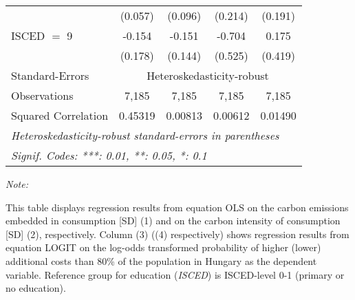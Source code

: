 \begin{table}[htbp!]
\begin{adjustbox}{width = 1\textwidth, max height = 0.95\textheight, center}
\begin{threeparttable}[b]
\begin{tabular}{lcccc}
                                 & (0.057)            & (0.096)            & (0.214)        & (0.191)\\   
            ISCED $=$ 9          & -0.154             & -0.151             & -0.704         & 0.175\\   
                                 & (0.178)            & (0.144)            & (0.525)        & (0.419)\\   
            \midrule 
            Standard-Errors & \multicolumn{4}{c}{Heteroskedasticity-robust} \\ 
            Observations         & 7,185              & 7,185              & 7,185          & 7,185\\  
            Squared Correlation  & 0.45319            & 0.00813            & 0.00612        & 0.01490\\  
            \midrule \midrule
            \multicolumn{5}{l}{\emph{Heteroskedasticity-robust standard-errors in parentheses}}\\
            \multicolumn{5}{l}{\emph{Signif. Codes: ***: 0.01, **: 0.05, *: 0.1}}\\
         \end{tabular}
         
         \begin{tablenotes}\item \medskip \textit{Note:}
            \item This table displays regression results from equation OLS on the carbon emissions embedded in consumption [SD] (1) and on the carbon intensity of consumption [SD] (2), respectively. 
                                      Column (3) ((4) respectively) shows regression results from equation LOGIT on the log-odds transformed probability of higher (lower) additional costs than 80\% of the population in Hungary as the dependent variable. Reference group for education (\textit{ISCED}) is ISCED-level 0-1 (primary or no education).
         \end{tablenotes}
      \end{threeparttable}
   \end{adjustbox}
\end{table}


